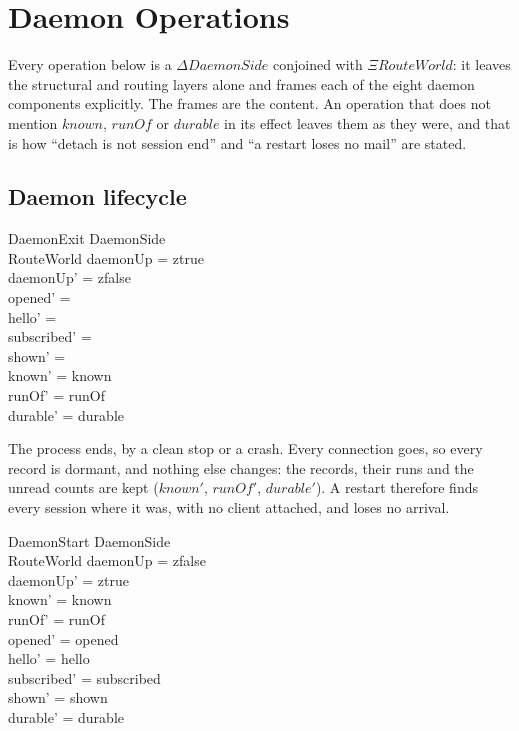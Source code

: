 \documentclass[a4paper,10pt,fleqn]{article}
\begin{document}
\section{Daemon Operations}
\label{sec:daemonops}

Every operation below is a $\Delta DaemonSide$ conjoined with $\Xi
RouteWorld$: it leaves the structural and routing layers alone and frames
each of the eight daemon components explicitly.  The frames are the
content.  An operation that does not mention $known$, $runOf$ or
$durable$ in its effect leaves them as they were, and that is how
``detach is not session end'' and ``a restart loses no mail'' are stated.

\subsection{Daemon lifecycle}

\begin{schema}{DaemonExit}
  \Delta DaemonSide \\
  \Xi RouteWorld
  \where
  daemonUp = ztrue \\
  daemonUp' = zfalse \\
  opened' = \emptyset \\
  hello' = \emptyset \\
  subscribed' = \emptyset \\
  shown' = \emptyset \\
  known' = known \\
  runOf' = runOf \\
  durable' = durable
\end{schema}

The process ends, by a clean stop or a crash.  Every connection goes, so
every record is dormant, and nothing else changes: the records, their
runs and the unread counts are kept ($known'$, $runOf'$, $durable'$).  A
restart therefore finds every session where it was, with no client
attached, and loses no arrival.

\begin{schema}{DaemonStart}
  \Delta DaemonSide \\
  \Xi RouteWorld
  \where
  daemonUp = zfalse \\
  daemonUp' = ztrue \\
  known' = known \\
  runOf' = runOf \\
  opened' = opened \\
  hello' = hello \\
  subscribed' = subscribed \\
  shown' = shown \\
  durable' = durable
\end{schema}
\end{document}
